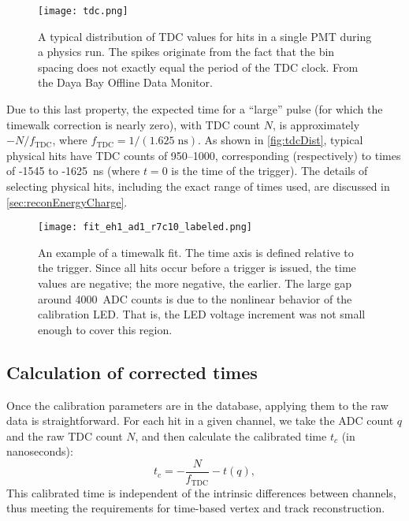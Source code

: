 \documentclass[../thesis.tex]{subfiles}
\begin{document}
\begin{figure}[ht]
  \texttt{[image: tdc.png]}
  \caption{A typical distribution of TDC values for hits in a single PMT during a physics run. The spikes originate from the fact that the bin spacing does not exactly equal the period of the TDC clock. From the Daya Bay Offline Data Monitor.}
  \label{fig:tdcDist}
\end{figure}

Due to this last property, the expected time for a ``large'' pulse (for which the timewalk correction is nearly zero), with TDC count $N$, is approximately $-N/f_{\mathrm{TDC}}$, where $f_{\mathrm{TDC}} = 1/(1.625\;\text{ns})$. As shown in \autoref{fig:tdcDist}, typical physical hits have TDC counts of 950--1000, corresponding (respectively) to times of -1545 to -1625~ns (where $t = 0$ is the time of the trigger). The details of selecting physical hits, including the exact range of times used, are discussed in \autoref{sec:reconEnergyCharge}.


\begin{figure}
  \texttt{[image: fit\_eh1\_ad1\_r7c10\_labeled.png]}
  \caption{An example of a timewalk fit. The time axis is defined relative to the trigger. Since all hits occur before a trigger is issued, the time values are negative; the more negative, the earlier. The large gap around 4000~ADC counts is due to the nonlinear behavior of the calibration LED. That is, the LED voltage increment was not small enough to cover this region.}
  \label{fig:timewalk}
\end{figure}

\begin{comment}
  Show the tof-corrected times; comment on TDC discretization.
\end{comment}

\subsection{Calculation of corrected times}

Once the calibration parameters are in the database, applying them to the raw data is straightforward. For each hit in a given channel, we take the ADC count $q$ and the raw TDC count $N$, and then calculate the calibrated time $t_c$ (in nanoseconds):
\begin{equation}
  \label{eq:corrTime}
  t_c = -\frac{N}{f_\mathrm{TDC}} - t(q),
\end{equation}
This calibrated time is independent of the intrinsic differences between channels, thus meeting the requirements for time-based vertex and track reconstruction.
\end{document}
